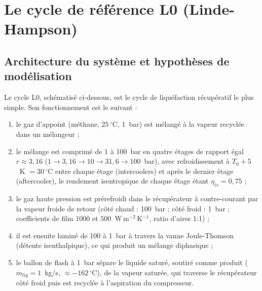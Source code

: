 \section{Le cycle de référence L0 (Linde-Hampson)}

\subsection{Architecture du système et hypothèses de modélisation}

Le cycle L0, schématisé ci-dessous, est le cycle de liquéfaction
récupératif le plus simple. Son fonctionnement est le suivant :
\begin{enumerate}
  \item le gaz d'appoint (méthane, $25\,^\circ$C, 1~bar) est mélangé à la
        vapeur recyclée dans un mélangeur ;
  \item le mélange est comprimé de 1 à 100~bar en quatre étages de rapport
        égal $r \approx 3{,}16$ ($1 \to 3{,}16 \to 10 \to 31{,}6 \to
        100$~bar), avec refroidissement à $T_0 + 5$~K $= 30\,^\circ$C entre
        chaque étage (intercoolers) et après le dernier étage (aftercooler),
        le rendement isentropique de chaque étage étant $\eta_{is} = 0{,}75$ ;
  \item le gaz haute pression est prérefroidi dans le récupérateur à
        contre-courant par la vapeur froide de retour (côté chaud : 100~bar ;
        côté froid : 1~bar ; coefficients de film $1000$ et $500$~W\,m$^{-2}$\,K$^{-1}$,
        ratio d'aires 1:1) ;
  \item il est ensuite laminé de 100 à 1~bar à travers la vanne
        Joule-Thomson (détente isenthalpique), ce qui produit un mélange
        diphasique ;
  \item le ballon de flash à 1~bar sépare le liquide saturé, soutiré comme
        produit ($\dot m_{liq} = 1$~kg/s, $\approx -162\,^\circ$C), de la
        vapeur saturée, qui traverse le récupérateur côté froid puis est
        recyclée à l'aspiration du compresseur.
\end{enumerate}


